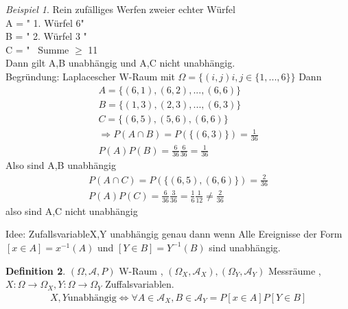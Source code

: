 \documentclass[a4paper,12pt,fleqn]{scrartcl}
\newcommand{\m}[1]{\mathcal{ #1 }}
\newcommand{\ZV}{Zufallsvariable}
\theoremstyle{definition}
\newtheorem{definition}{Definition}[section]
\theoremstyle{plain}
\theoremstyle{remark}
\newtheorem{beispiel}[definition]{Beispiel}
\begin{document}
\begin{beispiel}
Rein zufälliges Werfen zweier echter Würfel \\
A = " 1. Würfel 6" \\
B = " 2. Würfel 3 " \\
C = " \ Summe $\geq$ 11 \\
Dann gilt A,B unabhängig und A,C nicht unabhängig. \\

Begründung: Laplacescher W-Raum mit $ \Omega = \{ (i,j) i,j \in \{ 1,...,6 \} \}$ Dann 
\begin{align*}
A = \{ (6,1),(6,2),...,(6,6) \} \\
B = \{ (1,3),(2,3),...,(6,3) \} \\
C = \{ (6,5),(5,6),(6,6) \} \\
\Rightarrow P(A \cap B) = P( \{ (6,3) \} ) = \frac{1}{36} \\
P(A)P(B) = \frac{6}{36} \frac{6}{36} = \frac{1}{36}
\end{align*}
Also sind A,B unabhängig 
\begin{align*}
P(A \cap C ) = P(\{ (6,5),(6,6) \} ) = \frac{2}{36} \\
P(A)P(C) = \frac{6}{36} \frac{3}{36} = \frac{1}{6} \frac{1}{12} \neq \frac{2}{36} 
\end{align*}
also sind A,C nicht unabhängig \\
\end{beispiel}
Idee: \ZV  X,Y unabhängig genau dann wenn Alle Ereignisse der Form  $[x \in A] = x^{-1}(A) $ und $ [Y \in B] = Y^{-1}(B)$ sind unabhängig.

\begin{definition}
$( \Omega , \m{A} , P) $ W-Raum , $ ( \Omega_X , \m{A}_X ) , (\Omega_Y , \m{A}_Y ) $ Messräume , $X: \Omega \rightarrow \Omega_X , Y: \Omega \rightarrow \Omega_Y$ Zuffalsvariablen. 
\begin{align*}
X,Y \text{unabhängig} \Leftrightarrow \forall A \in \m{A}_X , B \in \m{A}_Y = P[x \in A]P[Y \in B]
\end{align*}
\end{definition}
\end{document}
